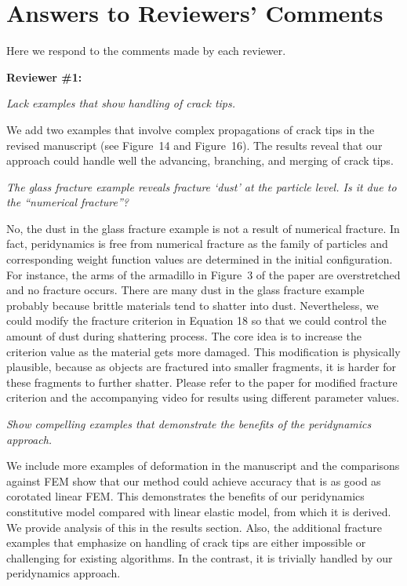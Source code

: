 \section{Answers to Reviewers' Comments}

Here we respond to the comments made by each reviewer.

\noindent{}\textbf{Reviewer \#1:}

\emph{Lack examples that show handling of crack tips.}

We add two examples that involve complex propagations of crack tips in the revised manuscript (see Figure~14 and Figure~16). The results reveal that our approach could handle well the advancing, branching, and merging of crack tips.

\emph{The glass fracture example reveals fracture `dust' at the particle level. Is it due to the ``numerical fracture''?}

No, the dust in the glass fracture example is not a result of numerical fracture. In fact, peridynamics is free from numerical fracture as the family of particles and corresponding weight function values are determined in the initial configuration. For instance, the arms of the armadillo in Figure~3 of the paper are overstretched and no fracture occurs. There are many dust in the glass fracture example probably because brittle materials tend to shatter into dust. Nevertheless, we could modify the fracture criterion in Equation 18 so that we could control the amount of dust during shattering process. The core idea is to increase the criterion value as the material gets more damaged. This modification is physically plausible, because as objects are fractured into smaller fragments, it is harder for these fragments to further shatter. Please refer to the paper for modified fracture criterion and the accompanying video for results using different parameter values.

\emph{Show compelling examples that demonstrate the benefits of the peridynamics approach.}

We include more examples of deformation in the manuscript and the comparisons against FEM show that our method could achieve accuracy that is as good as corotated linear FEM. This demonstrates the benefits of our peridynamics constitutive model compared with linear elastic model, from which it is derived. We provide analysis of this in the results section. Also, the additional fracture examples that emphasize on handling of crack tips are either impossible or challenging for existing algorithms. In the contrast, it is trivially handled by our peridynamics approach.

